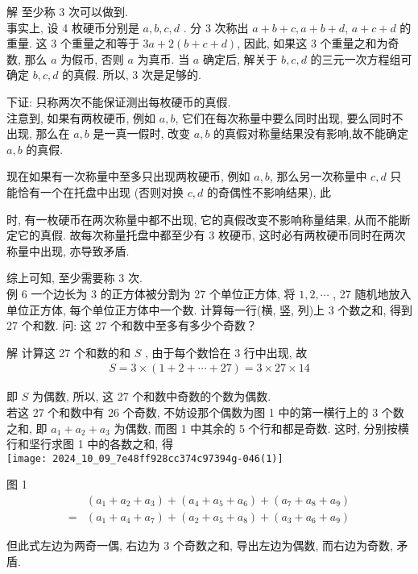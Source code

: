 	解 至少称 3 次可以做到.\\
	事实上, 设 4 枚硬币分别是 $a ,  b ,  c ,  d$ .  分 3 次称出 $a+b+c, a+b+d$, $a+c+d$ 的重量. 这 3 个重量之和等于 $3 a+2(b+c+d)$, 因此, 如果这 3 个重量之和为奇数, 那么 $a$ 为假币, 否则 $a$ 为真币. 当 $a$ 确定后, 解关于 $b ,  c ,  d$ 的三元一次方程组可确定 $b ,  c, d$ 的真假. 所以, 3 次是足够的.

	下证: 只称两次不能保证测出每枚硬币的真假. \\
	注意到, 如果有两枚硬币, 例如 $a, b$, 它们在每次称量中要么同时出现, 要么同时不出现, 那么在 $a ,  b$ 是一真一假时, 改变 $a ,  b$ 的真假对称量结果没有影响,故不能确定 $a, b$ 的真假.

	现在如果有一次称量中至多只出现两枚硬币, 例如 $a ,  b$, 那么另一次称量中 $c ,  d$ 只能恰有一个在托盘中出现 (否则对换 $c, d$ 的奇偶性不影响结果), 此

	时, 有一枚硬币在两次称量中都不出现, 它的真假改变不影响称量结果, 从而不能断定它的真假. 故每次称量托盘中都至少有 3 枚硬币, 这时必有两枚硬币同时在两次称量中出现, 亦导致矛盾.

	综上可知, 至少需要称 3 次. \\
	例 6 一个边长为 3 的正方体被分割为 27 个单位正方体, 将 $1,2, \cdots$ ,  27 随机地放入单位正方体, 每个单位正方体中一个数. 计算每一行(横, 竖, 列)上 3 个数之和, 得到 27 个和数. 问: 这 27 个和数中至多有多少个奇数？

	解 计算这 27 个和数的和 $S$ , 由于每个数恰在 3 行中出现, 故
	\begin{align*}
		S=3 \times(1+2+\cdots+27)=3 \times 27 \times 14
	\end{align*}

	即 $S$ 为偶数, 所以, 这 27 个和数中奇数的个数为偶数. \\
	若这 27 个和数中有 26 个奇数, 不妨设那个偶数为图 1 中的第一横行上的 3 个数之和, 即 $a_{1}+a_{2}+a_{3}$ 为偶数, 而图 1 中其余的 5 个行和都是奇数. 这时, 分别按横行和坚行求图 1 中的各数之和, 得\\
	\texttt{[image: 2024\_10\_09\_7e48ff928cc374c97394g-046(1)]}

	图 1\begin{align}
		  & \left(a_{1}+a_{2}+a_{3}\right)+\left(a_{4}+a_{5}+a_{6}\right)+\left(a_{7}+a_{8}+a_{9}\right) \\
		= & \left(a_{1}+a_{4}+a_{7}\right)+\left(a_{2}+a_{5}+a_{8}\right)+\left(a_{3}+a_{6}+a_{9}\right)
	\end{align}

	但此式左边为两奇一偶, 右边为 3 个奇数之和, 导出左边为偶数, 而右边为奇数, 矛盾.

